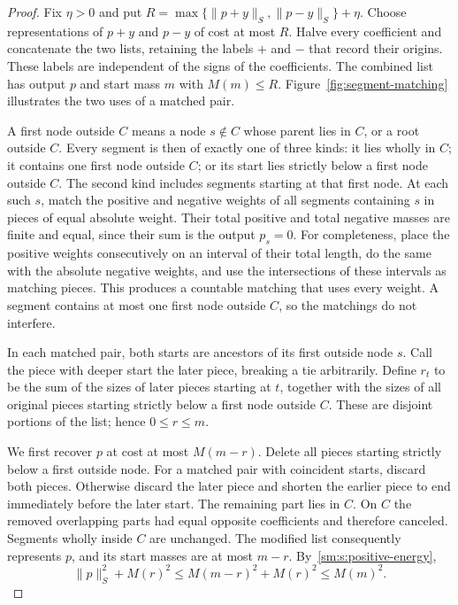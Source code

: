 \begin{proof}
Fix $\eta>0$ and put
$R=\max\{\|p+y\|_S,\|p-y\|_S\}+\eta$. Choose representations of $p+y$
and $p-y$ of cost at most $R$. Halve every coefficient and concatenate
the two lists, retaining the labels $+$ and $-$ that record their
origins. These labels are independent of the signs of the coefficients.
The combined list has output $p$ and start mass $m$ with $M(m)\le R$.
Figure~\ref{fig:segment-matching} illustrates the two uses of a matched pair.

A first node outside $C$ means a node $s\notin C$ whose parent lies in
$C$, or a root outside $C$. Every segment is then of exactly one of
three kinds: it lies wholly in $C$; it contains one first node outside
$C$; or its start lies strictly below a first node outside $C$.
The second kind includes segments starting at that first node.
At each such $s$, match the positive and
negative weights of all segments containing $s$ in pieces of equal
absolute weight. Their total positive and total negative masses are
finite and equal, since their sum is the output $p_s=0$. For completeness,
place the positive weights consecutively on an interval of their total
length, do the same with the absolute negative weights, and use the
intersections of these intervals as matching pieces. This produces a
countable matching that uses every weight. A segment contains at most
one first node outside $C$, so the matchings do not interfere.

In each matched pair, both starts are ancestors of its first outside
node $s$. Call the piece with deeper start the later piece, breaking a
tie arbitrarily. Define $r_t$ to be the sum of the sizes of later pieces
starting at $t$, together with the sizes of all original pieces starting
strictly below a first node outside $C$. These are disjoint portions of
the list; hence $0\le r\le m$.

We first recover $p$ at cost at most $M(m-r)$. Delete all pieces starting
strictly below a first outside node. For a matched pair with coincident
starts, discard both pieces. Otherwise discard the later piece and
shorten the earlier piece to end immediately before the later start.
The remaining part
lies in $C$. On $C$ the removed overlapping parts had equal opposite
coefficients and therefore canceled. Segments wholly inside $C$ are
unchanged. The modified list consequently represents $p$, and its start
masses are at most $m-r$. By~\eqref{sm:s:positive-energy},
\begin{equation}\label{sm:s:saved-mass}
 \|p\|_S^2+M(r)^2\le M(m-r)^2+M(r)^2\le M(m)^2.
\end{equation}


\end{proof}
